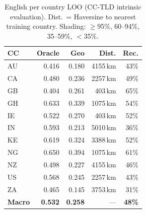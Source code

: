 \documentclass[11pt]{article}
\begin{document}
\begin{table}[t]
\centering
\small
\setlength{\tabcolsep}{4.5pt}
\begin{tabular}{lrrrr}
\toprule
\textbf{CC} & \textbf{Oracle} & \textbf{Geo} & \textbf{Dist.} & \textbf{Rec.}\\
\midrule
\rowcolor{mid}  AU & 0.416 & 0.180 & 4155\,km & 43\% \\
\rowcolor{mid}  CA & 0.480 & 0.236 & 2257\,km & 49\% \\
\rowcolor{high} GB & 0.404 & 0.261 &  403\,km & 65\% \\
\rowcolor{mid}  GH & 0.633 & 0.339 & 1075\,km & 54\% \\
\rowcolor{mid}  IE & 0.522 & 0.270 &  403\,km & 52\% \\
\rowcolor{mid}  IN & 0.593 & 0.213 & 5010\,km & 36\% \\
\rowcolor{mid}  KE & 0.619 & 0.324 & 3388\,km & 52\% \\
\rowcolor{high} NG & 0.650 & 0.394 & 1075\,km & 61\% \\
\rowcolor{mid}  NZ & 0.498 & 0.227 & 4155\,km & 46\% \\
\rowcolor{mid}  US & 0.568 & 0.245 & 2257\,km & 43\% \\
\rowcolor{low}  ZA & 0.465 & 0.145 & 3753\,km & 31\% \\
\midrule
\textbf{Macro} & \textbf{0.532} & \textbf{0.258} & --- & \textbf{48\%}\\
\bottomrule
\end{tabular}
\caption{English per country LOO (CC-TLD intrinsic evaluation).
  Dist.\ = Haversine to nearest training country.
  Shading: \colorbox{best}{$\geq$95\%}, \colorbox{high}{60--94\%}, \colorbox{mid}{35--59\%}, \colorbox{low}{$<$35\%}.}
\label{tab:en}
\end{table}
\end{document}
